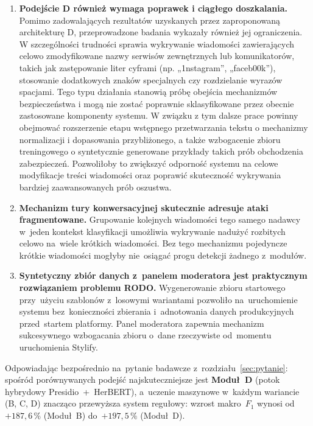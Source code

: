 \begin{enumerate}
  \item \textbf{Podejście D również wymaga poprawek i ciągłego doszkalania.}
    Pomimo zadowalających rezultatów uzyskanych przez zaproponowaną architekturę D, przeprowadzone badania wykazały również jej ograniczenia. W szczególności trudności sprawia wykrywanie wiadomości zawierających celowo zmodyfikowane nazwy serwisów zewnętrznych lub komunikatorów, takich jak zastępowanie liter cyframi (np. „1nstagram”, „faceb00k”), stosowanie dodatkowych znaków specjalnych czy rozdzielanie wyrazów spacjami. Tego typu działania stanowią próbę obejścia mechanizmów bezpieczeństwa i mogą nie zostać poprawnie sklasyfikowane przez obecnie zastosowane komponenty systemu. W związku z tym dalsze prace powinny obejmować rozszerzenie etapu wstępnego przetwarzania tekstu o mechanizmy normalizacji i dopasowania przybliżonego, a także wzbogacenie zbioru treningowego o syntetycznie generowane przykłady takich prób obchodzenia zabezpieczeń. Pozwoliłoby to zwiększyć odporność systemu na celowe modyfikacje treści wiadomości oraz poprawić skuteczność wykrywania bardziej zaawansowanych prób oszustwa.

  \item \textbf{Mechanizm tury konwersacyjnej skutecznie adresuje ataki fragmentowane.}
    Grupowanie kolejnych wiadomości tego samego nadawcy w~jeden kontekst
    klasyfikacji umożliwia wykrywanie nadużyć rozbitych celowo na~wiele
    krótkich wiadomości. Bez tego mechanizmu pojedyncze krótkie wiadomości
    mogłyby nie~osiągać progu detekcji żadnego z~modułów.

  \item \textbf{Syntetyczny zbiór danych z~panelem moderatora jest
    praktycznym rozwiązaniem problemu RODO.}
    Wygenerowanie zbioru startowego przy~użyciu szablonów z~losowymi
    wariantami pozwoliło na~uruchomienie systemu bez~konieczności
    zbierania i~adnotowania danych produkcyjnych przed~startem platformy.
    Panel moderatora zapewnia mechanizm sukcesywnego wzbogacania zbioru
    o~dane rzeczywiste od~momentu uruchomienia Stylify.


\end{enumerate}

\noindent Odpowiadając bezpośrednio na~pytanie badawcze z~rozdziału~\ref{sec:pytanie}:
spośród porównywanych podejść najskuteczniejsze jest \textbf{Moduł~D}
(potok hybrydowy Presidio~+~HerBERT), a~uczenie maszynowe w~każdym wariancie
(B, C, D) znacząco przewyższa system regułowy: wzrost makro~$F_1$
wynosi od~$+187{,}6\,\%$ (Moduł~B) do~$+197{,}5\,\%$ (Moduł~D).


